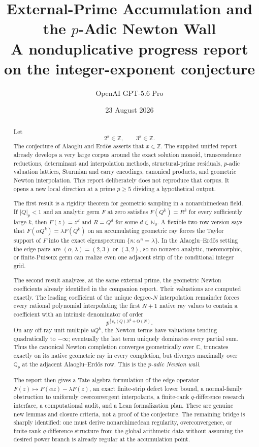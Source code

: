 \documentclass[11pt,oneside]{article}
\title{\textbf{External-Prime Accumulation and the $p$-Adic Newton Wall}\\[0.35em]
\large A nonduplicative progress report on the \AEconj{} integer-exponent conjecture}
\author{OpenAI GPT-5.6 Pro}
\date{23 August 2026}
\theoremstyle{definition}
\newcommand{\Nzero}{\mathbb N_0}
\newcommand{\Z}{\mathbb Z}
\newcommand{\C}{\mathbb C}
\newcommand{\Qp}{\mathbb Q_p}
\newcommand{\AEconj}{Alaoglu--Erd\H{o}s}
\begin{document}
\maketitle

\begin{abstract}
Let
\[
 2^x\in\Z,\qquad 3^x\in\Z.
\]
The conjecture of Alaoglu and Erd\H{o}s asserts that $x\in\Z$.  The supplied unified report
already develops a very large corpus around the exact solution monoid, transcendence
reductions, determinant and interpolation methods, structural-prime residuals, $p$-adic
valuation lattices, Sturmian and carry encodings, canonical products, and geometric Newton
interpolation.  This report deliberately does not reproduce that corpus.  It opens a new
local direction at a prime $p\ge5$ dividing a hypothetical output.

The first result is a rigidity theorem for geometric sampling in a nonarchimedean field.  If
$|Q|_p<1$ and an analytic germ $F$ at zero satisfies
$F(Q^k)=R^k$ for every sufficiently large $k$, then $F(z)=z^d$ and $R=Q^d$ for some
$d\in\Nzero$.  A flexible two-row version says that
$F(\alpha Q^k)=\lambda F(Q^k)$ on an accumulating geometric ray forces the Taylor support of
$F$ into the exact eigenspectrum $\{n:\alpha^n=\lambda\}$.  In the \AEconj{} setting the edge
pairs are $(\alpha,\lambda)=(2,3)$ or $(3,2)$, so no nonzero analytic, meromorphic, or
finite-Puiseux germ can realize even one adjacent strip of the conditional integer grid.

The second result analyzes, at the same external prime, the geometric Newton coefficients
already identified in the companion report.  Their valuations are computed exactly.  The
leading coefficient of the unique degree-$N$ interpolation remainder forces every rational
polynomial interpolating the first $N+1$ native ray values to contain a coefficient with an
intrinsic denominator of order
\[
 p^{\frac12 v_p(Q)N^2+\mathrm O(N)}.
\]
On any off-ray unit multiple $uQ^k$, the Newton terms have valuations tending quadratically
to $-\infty$; eventually the last term uniquely dominates every partial sum.  Thus the
canonical Newton completion converges geometrically over $\C$, truncates exactly on its
native geometric ray in every completion, but diverges maximally over $\Qp$ at the adjacent
\AEconj{} row.  This is the \emph{$p$-adic Newton wall}.

The report then gives a Tate-algebra formulation of the edge operator
$F(z)\mapsto F(\alpha z)-\lambda F(z)$, an exact finite-strip defect lower bound, a normal-family
obstruction to uniformly overconvergent interpolants, a finite-rank $q$-difference research
interface, a computational audit, and a Lean formalization plan.  These are genuine new
lemmas and closure criteria, not a proof of the conjecture.  The remaining bridge is sharply
identified: one must derive nonarchimedean regularity, overconvergence, or finite-rank
$q$-difference structure from the global arithmetic data without assuming the desired power
branch is already regular at the accumulation point.
\end{abstract}
\end{document}

